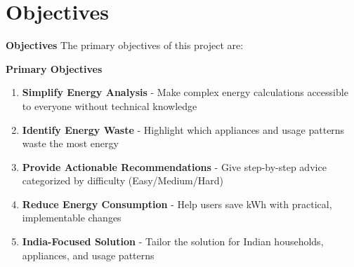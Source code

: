 \documentclass[11pt,aspectratio=169,notes,mathserif]{beamer}
\begin{document}
\section{Objectives}
\begin{frame}{\textbf{Objectives}}
    \justifying
    The primary objectives of this project are:
    
    \begin{block}{\textbf{Primary Objectives}}
        \begin{enumerate}
            \item \textbf{Simplify Energy Analysis} - Make complex energy calculations accessible to everyone without technical knowledge
            
            \item \textbf{Identify Energy Waste} - Highlight which appliances and usage patterns waste the most energy
            
            \item \textbf{Provide Actionable Recommendations} - Give step-by-step advice categorized by difficulty (Easy/Medium/Hard)
            
            \item \textbf{Reduce Energy Consumption} - Help users save kWh with practical, implementable changes
            
            \item \textbf{India-Focused Solution} - Tailor the solution for Indian households, appliances, and usage patterns
        \end{enumerate}
    \end{block}
\end{frame}
\end{document}
